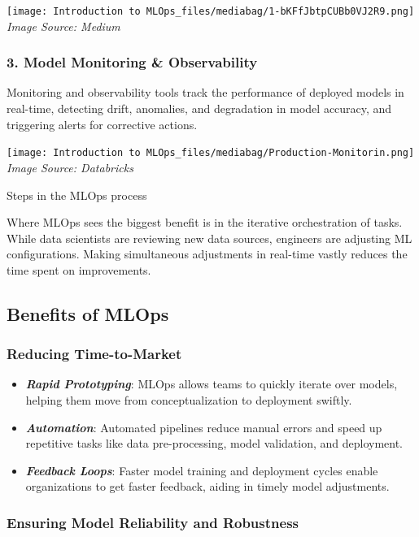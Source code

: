 \documentclass[
  letterpaper,
  DIV=11,
  numbers=noendperiod]{scrartcl}
\begin{document}
\texttt{[image: Introduction to MLOps\_files/mediabag/1-bKFfJbtpCUBb0VJ2R9.png]}
\emph{Image Source: Medium}

\subsubsection{3. Model Monitoring \&
Observability}\label{model-monitoring-observability}

Monitoring and observability tools track the performance of deployed
models in real-time, detecting drift, anomalies, and degradation in
model accuracy, and triggering alerts for corrective actions.

\texttt{[image: Introduction to MLOps\_files/mediabag/Production-Monitorin.png]}
\emph{Image Source: Databricks}

Steps in the MLOps process

Where MLOps sees the biggest benefit is in the iterative orchestration
of tasks. While data scientists are reviewing new data sources,
engineers are adjusting ML configurations. Making simultaneous
adjustments in real-time vastly reduces the time spent on improvements.

\subsection{Benefits of MLOps}\label{benefits-of-mlops}

\subsubsection{Reducing Time-to-Market}\label{reducing-time-to-market}

\begin{itemize}
\item
  \emph{\textbf{Rapid Prototyping}}: MLOps allows teams to quickly
  iterate over models, helping them move from conceptualization to
  deployment swiftly.
\item
  \emph{\textbf{Automation}}: Automated pipelines reduce manual errors
  and speed up repetitive tasks like data pre-processing, model
  validation, and deployment.
\item
  \emph{\textbf{Feedback Loops}}: Faster model training and deployment
  cycles enable organizations to get faster feedback, aiding in timely
  model adjustments.
\end{itemize}

\subsubsection{Ensuring Model Reliability and
Robustness}\label{ensuring-model-reliability-and-robustness}
\end{document}
